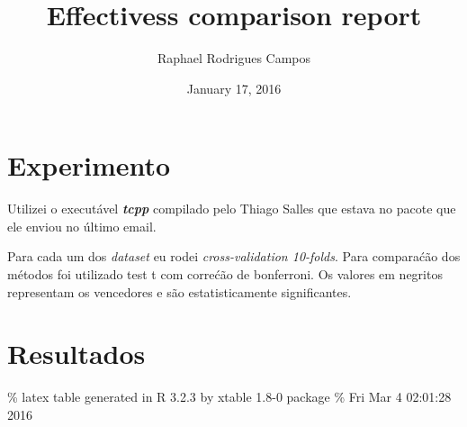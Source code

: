 \documentclass[]{article}
\title{Effectivess comparison report}
\author{Raphael Rodrigues Campos}
\date{January 17, 2016}
\begin{document}
\maketitle


\section{Experimento}\label{experimento}

Utilizei o executável \textbf{\emph{tcpp}} compilado pelo Thiago Salles
que estava no pacote que ele enviou no último email.

Para cada um dos \emph{dataset} eu rodei \emph{cross-validation
10-folds}. Para comparaćão dos métodos foi utilizado test t com correćão
de bonferroni. Os valores em negritos representam os vencedores e são
estatisticamente significantes.

\section{Resultados}\label{resultados}

\% latex table generated in R 3.2.3 by xtable 1.8-0 package \% Fri Mar 4
02:01:28 2016
\end{document}
